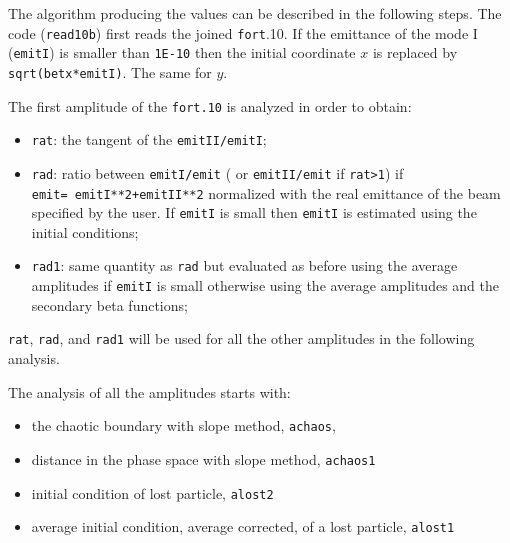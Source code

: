 \documentclass{cernatsnote}
\begin{document}


The algorithm producing the values can be described in the following steps.
The code (\texttt{read10b}) first reads the joined \texttt{fort}.10.  If the
emittance of the mode I (\texttt{emitI}) is smaller than \texttt{1E-10} then the
initial coordinate $x$ is replaced by \texttt{sqrt(betx*emitI)}. The same for
$y$.


The first amplitude of the \texttt{fort.10} is analyzed in order to obtain:
\begin{itemize}
\item \texttt{rat}: the tangent of the \texttt{emitII/emitI};
\item \texttt{rad}: ratio between \texttt{emitI/emit} (
or \texttt{emitII/emit} if \texttt{rat>1}) if \\ {\tt emit=
emitI**2+emitII**2} normalized with the real emittance of the beam specified
by the user.  If \texttt{emitI} is small then \texttt{emitI} is estimated using the
initial conditions;
\item \texttt{rad1}: same quantity as \texttt{rad} but evaluated as before using the
average amplitudes if \texttt{emitI} is small otherwise using the average
amplitudes and the secondary beta functions;
\end{itemize}

\texttt{rat}, \texttt{rad}, and \texttt{rad1} will be used for all the other amplitudes
in the following analysis.


The analysis of all the amplitudes starts with:
\begin{itemize}
\item the chaotic boundary with slope method, \texttt{achaos},
\item distance in the phase space with slope method, \texttt{achaos1}
\item initial condition of lost particle, \texttt{alost2}
\item average initial condition, average corrected, of a lost particle,
  \texttt{alost1}
\end{itemize}
\end{document}

